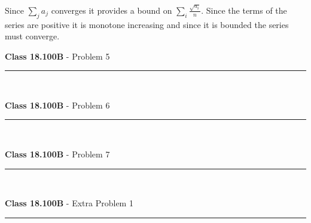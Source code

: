 \documentclass[11pt,reqno]{article}
\begin{document}
\noindent Since $\sum_j a_j$ converges it provides a bound on $\sum_i \frac{\sqrt{a_i}}{n}$. Since the terms of the series are positive it is monotone increasing and since it is bounded the series must converge.

\vspace{15pt}
\begin{flushleft} 
\textbf{Class 18.100B} - Problem 5\\
\rule{500pt}{1pt}\\
\end{flushleft} 




\vspace{15pt}
\begin{flushleft} 
\textbf{Class 18.100B} - Problem 6\\
\rule{500pt}{1pt}\\
\end{flushleft} 


\vspace{15pt}
\begin{flushleft} 
\textbf{Class 18.100B} - Problem 7\\
\rule{500pt}{1pt}\\
\end{flushleft} 


\indent 
\vspace{15pt}
\begin{flushleft} 
\textbf{Class 18.100B} - Extra Problem 1\\
\rule{500pt}{1pt}\\
\end{flushleft} 
\end{document}
